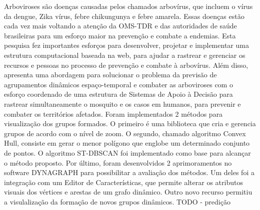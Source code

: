Arboviroses são doenças causadas pelos chamados arbovírus, que incluem o vírus da dengue, Zika vírus, febre chikungunya e febre amarela. Essas doenças estão cada vez mais voltando a atenção da OMS-TDR e das autoridades de saúde brasileiras para um esforço maior na prevenção e combate a endemias. Esta pesquisa fez importantes esforços para desenvolver, projetar e implementar uma estrutura computacional baseada na web, para ajudar a rastrear e gerenciar os recursos e pessoas no processo de prevenção e combate à arbovírus. Além disso, apresenta uma abordagem para solucionar o problema da previsão de agrupamentos dinâmicos espaço-temporal e combater as arboviroses com o esforço coordenado de uma estrutura de Sistemas de Apoio à Decisão para rastrear simultaneamente o mosquito e os casos em humanos, para prevenir e combater os territórios afetados.
 Foram implementados 2 métodos para visualização dos grupos formados.
O primeiro é uma biblioteca que cria e gerencia grupos de acordo com o nível de zoom.
O segundo, chamado algoritmo Convex Hull, consiste em gerar o menor polígono que englobe um determinado
conjunto de pontos. O algoritmo ST-DBSCAN foi implementado como base para alcançar o método proposto.
Por último, foram desenvolvidos 2 aprimoramentos no software DYNAGRAPH para
possibilitar a avaliação dos métodos. Um deles foi a integração com um Editor de
Características, que permite alterar os atributos visuais dos vértices e arestas de um
grafo dinâmico. Outro novo recurso permitiu a visulalização da formação de novos grupos dinâmicos.
TODO - predição


